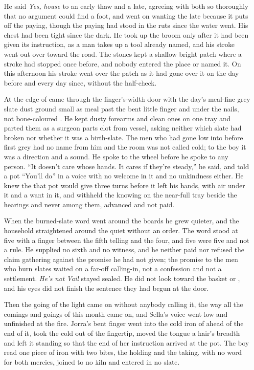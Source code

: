 He said \emph{Yes, house} to an early thaw and a late, agreeing with both so thoroughly that no argument could find a foot, and went on wanting the late because it puts off the paying, though the paying had stood in the ruts since the water went. His chest had been tight since the dark. He took up the broom only after it had been given its instruction, as a man takes up a tool already named, and his stroke went out over  toward the road. The stones kept a shallow bright patch where a stroke had stopped once before, and nobody entered the place or named it. On this afternoon his stroke went over the patch as it had gone over it on the day before and every day since, without the half-check.

At the edge of   came through the finger's-width door with the day's meal-fine grey slate dust ground small as meal past the bent little finger and under the nails, not bone-coloured . He kept dusty forearms and clean ones on one tray and parted them as a surgeon parts clot from vessel, asking neither which slate had broken nor whether it was a birth-slate. The men who had gone low into  before first grey had no name from him and the room was not called cold; to the boy it was a direction and a sound. He spoke to the wheel before he spoke to any person. “It doesn't care whose hands. It cares if they're steady,” he said, and told a pot “You'll do” in a voice with no welcome in it and no unkindness either. He knew the  that pot would give three turns before it left his hands, with air under it and a want in it, and withheld the knowing on the near-full tray beside the hearings and never among them, advanced and not paid.

When the burned-slate word went around the boards he grew quieter, and the household straightened around the quiet without an order. The word stood at five with a finger between the fifth telling and the four, and five were five and not a rule. He supplied no sixth and no witness, and he neither paid nor refused the claim gathering against the promise he had not given; the promise to the men who burn slates waited on a far-off calling-in, not a confession and not a settlement. \emph{He's not Vail} stayed sealed. He did not look toward the basket or , and his eyes did not finish the sentence they had begun at the door.

Then the going of the light came on without anybody calling it, the way all the comings and goings of this month came on, and Sella's voice went low and unfinished at the fire. Jorra's bent finger went into the cold iron of  ahead of the end of it, took the cold out of the fingertip, moved the tongue a hair's breadth and left it standing so that the end of her instruction arrived at the pot. The boy read one piece of iron with two bites, the holding and the taking, with no  word for both mercies, joined to no kiln and entered in no slate.

